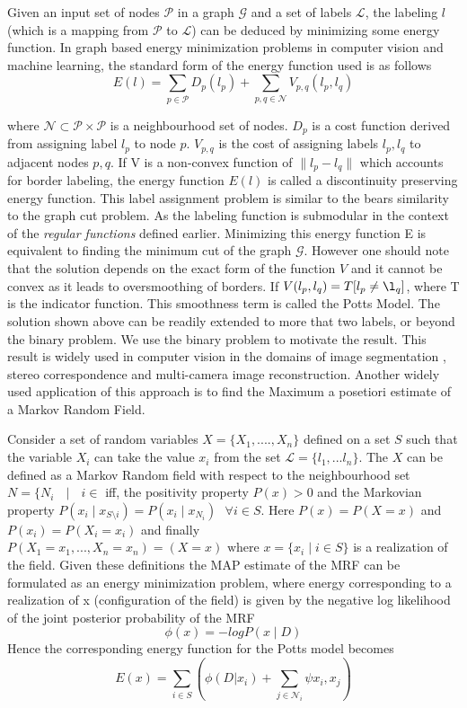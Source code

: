 Given an input set of nodes $\mathcal{P}$ in a graph $\mathcal{G}$ and a set of labels $\mathcal{L}$, the labeling $l$ (which is a mapping from $\mathcal{P}$ to $\mathcal{L}$) can be deduced by minimizing some energy function. In graph based energy minimization problems in computer vision and machine learning, the standard form of the energy function used is as follows
\[
E(l) = \underset{p\in\mathcal{P}}{\operatorname{\sum}} D_p(l_p) + \underset{p,q\in\mathcal{N}}{\operatorname{\sum}} V_{p,q}(l_p,l_q)
\]

where $\mathcal{N} \subset \mathcal{P}\times\mathcal{P}$ is a neighbourhood set of nodes. $D_p$ is a cost function derived from assigning label $l_p$ to node $p$. $V_{p,q}$ is the cost of assigning labels $l_p,l_q$ to adjacent nodes $p,q$. If V is a non-convex function of $\|l_p - l_q\|$ which accounts for border labeling, the energy function $E(l)$ is called a discontinuity preserving energy function. This label assignment problem is similar to the bears similarity to the graph cut problem. As the labeling function is submodular in the context of the {\it regular functions} defined earlier. Minimizing this energy function E is equivalent to finding the minimum cut of the graph $\mathcal{G}$. However one should note that the solution depends on the exact form of the function $V$ and it cannot be convex as it leads to oversmoothing of borders. If $V(l_p,l_q)=T[l_p\neq\l_q]$, where T is the indicator function. This smoothness term is called the Potts Model. The solution shown above can be readily extended to more that two labels, or beyond the binary problem. We use the binary problem to motivate the result. This result is widely used in computer vision in the domains of image segmentation , stereo correspondence and multi-camera image reconstruction. Another widely used application of this approach is to find the Maximum a posetiori estimate of a Markov Random Field.

Consider a set of random variables $X = \{X_1,....,X_n\}$ defined on a set $S$ such that the variable $X_i$ can take the value $x_i$ from the set $\mathcal{L} = \{l_1,...l_n\}$. The $X$ can be defined as a Markov Random field with respect to the neighbourhood set $N = \{N_i \text{ } \mid \text{ } i\in$ iff, the positivity property $P(x) > 0$ and the Markovian property $P(x_i\mid x_{S\setminus {i}}) = P(x_i \mid x_{N_i}) \text{ } \forall i \in S$. Here $P(x) = P(X = x)$ and $P(x_i) = P(X_i = x_i)$ and finally $P(X_1 = x_1,...,X_n = x_n)  = (X = x) \text{ where } x = \{x_i \mid i\in S\}$ is a realization of the field. Given these definitions the MAP estimate of the MRF can be formulated as an energy minimization problem, where energy corresponding to a realization of x (configuration of the field) is given by the negative log likelihood of the joint posterior probability of the MRF
\[
\phi(x) = -logP(x\mid D)
\]
Hence the corresponding energy function for the Potts model becomes 
\[
E(x) =  \underset{i\in S}{\operatorname{\sum}} \left(\phi(D|x_i) + \underset{j\in \mathcal{N}_i}{\operatorname{\sum}}\psi{x_i,x_j} \right)
\]

